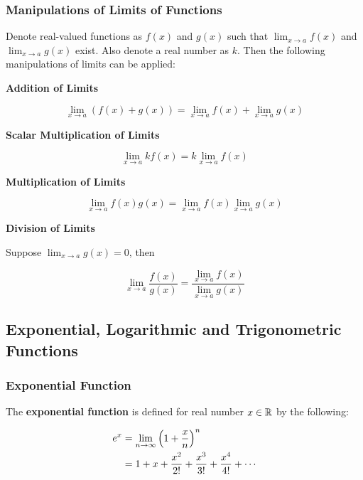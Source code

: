 \documentclass[a4paper,12pt]{article}
\begin{document}
\subsubsection{Manipulations of Limits of Functions}
\begin{pst}
  Denote real-valued functions as $f(x)$ and $g(x)$ such that $\lim_{x\to a}f(x)$ and $\lim_{x\to a}g(x)$ exist. Also denote a real number as $k$. Then the following manipulations of limits can be applied:

  \propdisp

  \begin{alist}
    \item \textbf{Addition of Limits}

    $$\lim_{x\to a}(f(x)+g(x))=\lim_{x\to a}f(x)+\lim_{x\to a}g(x)$$

    \item \textbf{Scalar Multiplication of Limits}

    $$\lim_{x\to a}kf(x)=k\lim_{x\to a}f(x)$$

    \item \textbf{Multiplication of Limits}

    $$\lim_{x\to a}f(x)g(x)=\lim_{x\to a}f(x)\lim_{x\to a}g(x)$$

    \item \textbf{Division of Limits}\n

    Suppose $\lim_{x\to a}g(x)=0$, then

    $$\lim_{x\to a}\frac{f(x)}{g(x)}=\frac{\lim_{x\to a}f(x)}{\lim_{x\to a}g(x)}$$
  \end{alist}
\end{pst}

\subsection{Exponential, Logarithmic and Trigonometric Functions}
\subsubsection{Exponential Function}
\begin{dft}
  The \textbf{exponential function} is defined for real number $x\in \mathbb{R}$ by the following:

  $$\begin{aligned}[t]
    e^{x}&=\lim_{n\to\infty}\left( 1+\frac{x}{n}\right)^{n}\\
    &=1+x+\frac{x^{2}}{2!}+\frac{x^{3}}{3!}+\frac{x^{4}}{4!}+\cdots
  \end{aligned}$$
\end{dft}\n
\end{document}
